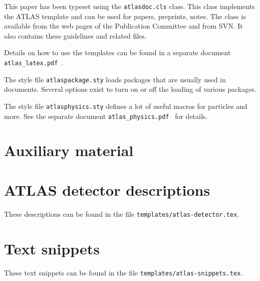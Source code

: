 \documentclass[UKenglish]{latex/atlasdoc}
\newcommand{\File}[1]{\texttt{#1}\xspace}
\begin{document}
This paper has been typeset using the \texttt{atlasdoc.cls} class.
This class implements the ATLAS template and can be used for papers, preprints,
notes. The class is available from the web pages of the
Publication Committee and from SVN.
It also contains these guidelines and related files.

Details on how to use the templates can be found in a separate document
\texttt{atlas\_latex.pdf}~\cite{atlas-latex}.

The style file \File{atlaspackage.sty} loads packages that are usually used in documents.
Several options exist to turn on or off the loading of various packages.

The style file \texttt{atlasphysics.sty} defines a lot of useful
macros for particles and more. See the separate document
\texttt{atlas\_physics.pdf}~\cite{atlas-physics} for details.


\printbibliography
% 
% 


\clearpage
\appendix
\section*{Auxiliary material}


\section{ATLAS detector descriptions}
\label{app:atlasdet}

These descriptions can be found in the file \File{templates/atlas-detector.tex}.




\section{Text snippets}
\label{app:snippet}

These text snippets can be found in the file \File{templates/atlas-snippets.tex}.


\end{document}
